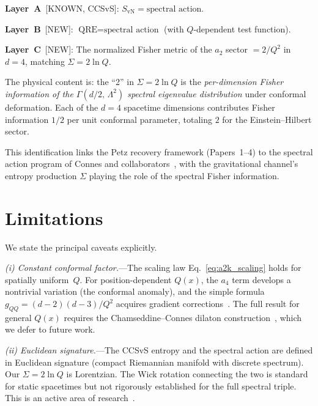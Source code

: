 \documentclass[prl,twocolumn,superscriptaddress,longbibliography]{revtex4-2}
\newcommand{\SvN}{S_{\mathrm{vN}}}
\begin{document}
\smallskip
\noindent
\textbf{Layer~A}~[KNOWN, CCSvS]:
$\SvN = \text{spectral action}$.

\smallskip
\noindent
\textbf{Layer~B}~[NEW]:
$\text{QRE} = \text{spectral action}$
(with $Q$-dependent test function).

\smallskip
\noindent
\textbf{Layer~C}~[NEW]:
The normalized Fisher metric of the $a_2$ sector
$= 2/Q^2$ in $d=4$, matching
$\Sigma = 2\ln Q$.

\smallskip
The physical content is:
the ``2'' in $\Sigma = 2\ln Q$ is the
\emph{per-dimension Fisher information of the
$\Gamma(d/2,\, \Lambda^2)$ spectral eigenvalue
distribution} under conformal deformation.
Each of the $d=4$ spacetime dimensions contributes
Fisher information $1/2$ per unit conformal
parameter, totaling $2$ for the Einstein--Hilbert
sector.

This identification links the Petz recovery
framework (Papers~1--4) to the spectral action
program of Connes and
collaborators~\cite{CC1996,CCSvS2018,vS2024},
with the gravitational channel's entropy production
$\Sigma$ playing the role of the spectral Fisher
information.


\section{Limitations}
\label{sec:limitations}

We state the principal caveats explicitly.

\emph{(i) Constant conformal factor.}---The
scaling law Eq.~\eqref{eq:a2k_scaling} holds
for spatially uniform~$Q$.
For position-dependent $Q(x)$, the $a_4$
term develops a nontrivial variation (the
conformal anomaly), and the simple formula
$g_{QQ} = (d-2)(d-3)/Q^2$ acquires gradient
corrections~\cite{CC2006}.
The full result for general $Q(x)$ requires
the Chamseddine--Connes dilaton
construction~\cite{CC2006}, which we defer to
future work.

\emph{(ii) Euclidean signature.}---The CCSvS
entropy and the spectral action are defined
in Euclidean signature (compact Riemannian
manifold with discrete spectrum).
Our $\Sigma = 2\ln Q$ is Lorentzian.
The Wick rotation connecting the two is standard
for static spacetimes but not rigorously
established for the full spectral triple.
This is an active area of
research~\cite{vandenDungen2016,Besnard2017}.
\end{document}

